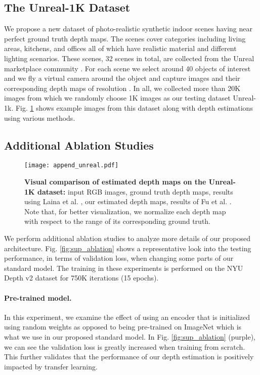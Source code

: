 \documentclass[10pt,twocolumn,letterpaper]{article}
\begin{document}
\subsection{The Unreal-1K Dataset}

We propose a new dataset of photo-realistic synthetic indoor scenes having near perfect ground truth depth maps. The scenes cover categories including living areas, kitchens, and offices all of which have realistic material and different lighting scenarios. These scenes, 32 scenes in total, are collected from the Unreal marketplace community \cite{UnrealMarket2018}. For each scene we select around 40 objects of interest and we fly a virtual camera around the object and capture images and their corresponding depth maps of resolution . In all, we collected more than 20K images from which we randomly choose 1K images as our testing dataset Unreal-1k. Fig. \ref{fig:append-fig1} shows example images from this dataset along with depth estimations using various methods.


\subsection{Additional Ablation Studies}
\label{sec:sup_ablation}

\begin{figure}[t]
\begin{center}
\texttt{[image: append\_unreal.pdf]}
\end{center}
   \caption{\textbf{Visual comparison of estimated depth maps on the Unreal-1K dataset:} input RGB images, ground truth depth maps, results using Laina et al. \cite{Laina2016}, our estimated depth maps, results of Fu et al. \cite{Fu2018DeepOR}. Note that, for better visualization, we normalize each depth map with respect to the range of its corresponding ground truth.}
\label{fig:append-fig1}
\end{figure}



We perform additional ablation studies to analyze more details of our proposed architecture. Fig. \ref{fig:sup_ablation} shows a representative look into the testing performance, in terms of validation loss, when changing some parts of our standard model. The training in these experiments is performed on the NYU Depth v2 dataset \cite{Silberman2012} for 750K iterations (15 epochs).

\paragraph{Pre-trained model.} In this experiment, we examine the effect of using an encoder that is initialized using random weights as opposed to being pre-trained on ImageNet which is what we use in our proposed standard model. In Fig. \ref{fig:sup_ablation} (purple), we can see the validation loss is greatly increased when training from scratch. This further validates that the performance of our depth estimation is positively impacted by transfer learning.
\end{document}
